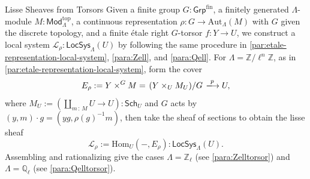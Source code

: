 \documentclass[11pt,letterpaper]{article}
\theoremstyle{numberfirstplain}
\numberwithin{equation}{theorem}
\theoremstyle{numberfirstupright}
\begin{document}
\begin{custom}{Lisse Sheaves from Torsors}\label{ex:torsor}
  Given a finite group $G:\mathsf{Grp}^{\mathrm{fin}}$, a finitely generated $\Lambda$-module $M:\mathsf{Mod}^{\mathrm{top}}_{\Lambda}$, a continuous representation $\rho:G\rightarrow\mathrm{Aut}_\Lambda(M)$ with $G$ given the discrete topology, and a finite étale right $G$-torsor $f:Y\rightarrow U$, we construct a local system $\mathcal L_\rho:\mathsf{LocSys}_\Lambda(U)$ by following the same procedure in \cref{par:etale-representation-local-system}, \cref{para:Zell}, and \cref{para:Qell}. 
  For $\Lambda=\mathbb Z/\ell^n\mathbb Z$, as in \cref{par:etale-representation-local-system}, form the cover 
  $$E_\rho:=Y\times^G M=\left.\left(Y\times_U M_U\right)\middle/G\right.\xlongrightarrow{p}U,$$
  where $M_U:=(\coprod_{m\,:\,M}U\rightarrow U):\mathsf{Sch}_U$ and $G$ acts by $(y,m)\cdot g=(yg,\rho(g)^{-1}m)$, then take the sheaf of sections to obtain the lisse sheaf
  $$\mathcal L_\rho:=\mathrm{Hom}_U(-,E_\rho):\mathsf{LocSys}_\Lambda(U).$$
  Assembling and rationalizing give the cases $\Lambda=\mathbb Z_\ell$ (see \cref{para:Zelltorsor}) and $\Lambda=\mathbb Q_\ell$ (see \cref{para:Qelltorsor}). 
\end{custom}
\end{document}
